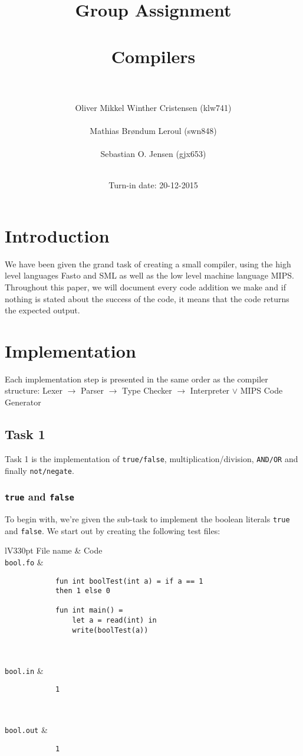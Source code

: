 \documentclass[a4paper]{article}
\title{Group Assignment\\ \ \\Compilers\\ \ \\}
\author{Oliver Mikkel Winther Cristensen (klw741) \\ \ \\Mathias Brøndum Leroul (swn848)\\ \ \\Sebastian O. Jensen (gjx653)\\ \ \\}
\date{Turn-in date: 20-12-2015}
\newcommand{\command}[1]{\texttt{\string#1}}
\begin{document}
\maketitle
\newpage

\tableofcontents
\newpage

\section{Introduction}
	We have been given the grand task of creating a small compiler, using the high level languages Fasto and SML as well as the low level machine language MIPS. Throughout this paper, we will document every code addition we make and if nothing is stated about the success of the code, it means that the code returns the expected output.
	
\section{Implementation}
	Each implementation step is presented in the same order as the compiler structure: Lexer $\rightarrow$ Parser $\rightarrow$ Type Checker $\rightarrow$ Interpreter $\vee$ MIPS Code Generator
\subsection{Task 1}
	Task 1 is the implementation of \texttt{true/false}, multiplication/division, \texttt{AND/OR} and finally \texttt{not/negate}. 
	
\subsubsection{\texttt{true} and \texttt{false}}

	To begin with, we're given the sub-task to implement the boolean literals \texttt{true} and \texttt{false}. We start out by creating the following test files:
	
\begin{center}	
	\begin{tabular}{lV{330pt}}
		\toprule
		File name & Code\\
		\midrule
		\command{bool.fo} &
		\begin{verbatim}
			fun int boolTest(int a) = if a == 1
			then 1 else 0
			
			fun int main() =
			    let a = read(int) in
			    write(boolTest(a))
			  
		\end{verbatim}
		\\
		\command{bool.in} &
		\begin{verbatim}
			1
			
		\end{verbatim}
		\\
		\command{bool.out} &
		\begin{verbatim}
			1
		\end{verbatim}
		\\
		\bottomrule \\
	\end{tabular}
\end{center}
\end{document}
